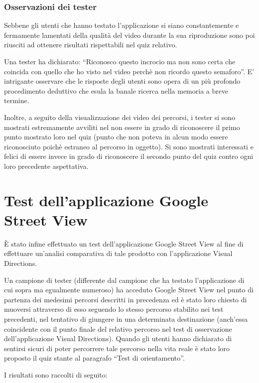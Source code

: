 \documentclass[12pt,a4paper,openright, notitlepage]{report}
\begin{document}
\subsubsection{Osservazioni dei tester}

Sebbene gli utenti che hanno testato l’applicazione si siano constantemente e fermamente lamentati della qualità del video durante la sua riproduzione sono poi riusciti ad ottenere risultati rispettabili nel quiz relativo. 

Una tester ha dichiarato: “Riconosco questo incrocio ma non sono certa che coincida con quello che ho visto nel video perchè non ricordo questo semaforo”. E’ intrigante osservare che le risposte degli utenti sono opera di un più profondo procedimento deduttivo che esula la banale ricerca nella memoria a breve termine. 

Inoltre, a seguito della visualizzazione dei video dei percorsi, i tester si sono mostrati estremamente avviliti nel non essere in grado di riconoscere il primo punto mostrato loro nel quiz (punto che non poteva in alcun modo essere riconosciuto poichè estraneo al percorso in oggetto). Si sono mostrati interessati e felici di essere invece in grado di riconoscere il secondo punto del quiz contro ogni loro precedente aspettativa.

\section{Test dell’applicazione Google Street View}

È stato infine effettuato un test dell’applicazione Google Street View al fine di effettuare un’analisi comparativa di tale prodotto con l’applicazione Visual Directions.

Un campione di tester (differente dal campione che ha testato l’applicazione di cui sopra ma egualmente numeroso) ha acceduto Google Street View nel punto di partenza dei medesimi percorsi descritti in precedenza ed è stato loro chiesto di muoversi attraverso di esso seguendo lo stesso percorso stabilito nei test precedenti, nel tentativo di giungere in una determinata destinazione (anch’essa coincidente con il punto finale del relativo percorso nel test di osservazione dell’applicazione Visual Directions). Quando gli utenti hanno dichiarato di sentirsi sicuri di poter percorrere tale percorso nella vita reale è stato loro proposto il quiz stante al paragrafo “Test di orientamento”.

I risultati sono raccolti di seguito:
\end{document}

